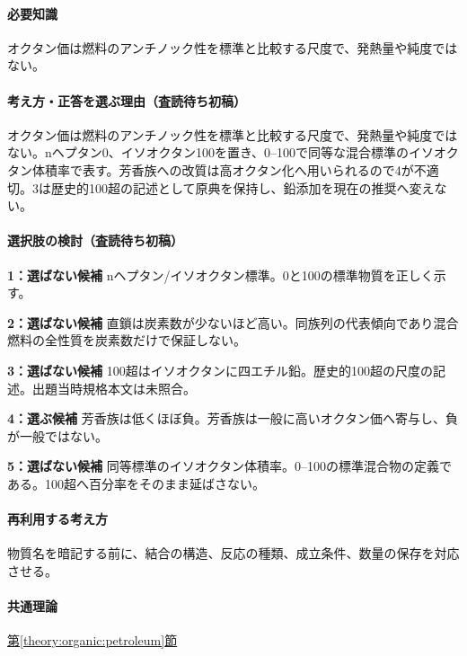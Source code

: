 \paragraph{必要知識} オクタン価は燃料のアンチノック性を標準と比較する尺度で、発熱量や純度ではない。

\paragraph{考え方・正答を選ぶ理由（査読待ち初稿）} オクタン価は燃料のアンチノック性を標準と比較する尺度で、発熱量や純度ではない。nヘプタン0、イソオクタン100を置き、0–100で同等な混合標準のイソオクタン体積率で表す。芳香族への改質は高オクタン化へ用いられるので4が不適切。3は歴史的100超の記述として原典を保持し、鉛添加を現在の推奨へ変えない。

\paragraph{選択肢の検討（査読待ち初稿）}\mbox{}\par

\noindent\textbf{1：選ばない候補} nヘプタン/イソオクタン標準。0と100の標準物質を正しく示す。\par

\noindent\textbf{2：選ばない候補} 直鎖は炭素数が少ないほど高い。同族列の代表傾向であり混合燃料の全性質を炭素数だけで保証しない。\par

\noindent\textbf{3：選ばない候補} 100超はイソオクタンに四エチル鉛。歴史的100超の尺度の記述。出題当時規格本文は未照合。\par

\noindent\textbf{4：選ぶ候補} 芳香族は低くほぼ負。芳香族は一般に高いオクタン価へ寄与し、負が一般ではない。\par

\noindent\textbf{5：選ばない候補} 同等標準のイソオクタン体積率。0–100の標準混合物の定義である。100超へ百分率をそのまま延ばさない。\par

\paragraph{再利用する考え方} 物質名を暗記する前に、結合の構造、反応の種類、成立条件、数量の保存を対応させる。

\paragraph{共通理論} \hyperref[theory:organic:petroleum]{第\ref*{theory:organic:petroleum}節}

